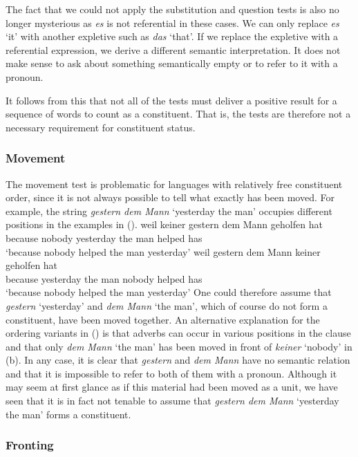 {The fact that we could not apply the substitution and question tests is also no longer mysterious as
\emph{es} is not referential in these cases. We can only replace \emph{es} `it' with another expletive such
as \emph{das} `that'. If we replace the expletive with a referential expression, we derive a different semantic
interpretation. It does not make sense to ask about something semantically empty or to refer to it with
a pronoun.

It follows from this that not all of the tests must deliver a positive result for a sequence of words to count as a constituent.
That is, the tests are therefore not a necessary requirement for constituent status.

\subsubsection{Movement}

The movement test is problematic for languages with relatively free constituent order, since it is not
always possible to tell what exactly has been moved. For example, the string \emph{gestern dem Mann}
`yesterday the man' occupies different positions
in the examples in ().
\eal
\ex 
\gll weil keiner gestern dem Mann geholfen hat\\
     because nobody yesterday the man helped has\\
\glt `because nobody helped the man yesterday'
\ex 
\gll weil gestern dem Mann keiner geholfen hat\\
	 because yesterday the man nobody helped has\\
\glt `because nobody helped the man yesterday'
\zl
One could therefore assume that \emph{gestern} `yesterday' and \emph{dem Mann} `the man', which of course do not form a constituent, 
have been moved together. An alternative explanation for the ordering variants in () is that adverbs can occur in various positions
in the clause and that only \emph{dem Mann} `the man' has been moved in front of \emph{keiner}
`nobody' in (b). In any case, it is clear that \emph{gestern} and \emph{dem Mann}
have no semantic relation and that it is impossible to refer to both of them with a pronoun. Although it may seem at first glance as if this material had been moved as
a unit, we have seen that it is in fact not tenable to assume that \emph{gestern dem Mann} `yesterday the man' forms a constituent.

\subsubsection{Fronting}
\label{sec-konst-test-probleme-voranstellung} 

}
